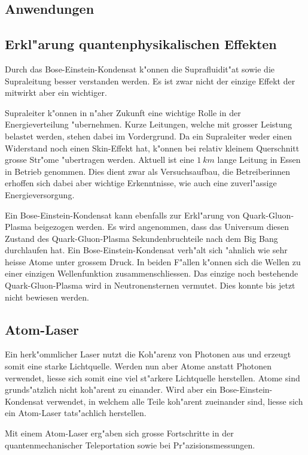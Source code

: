 \begin{refsection}
\section{Anwendungen}
\subsection{Erkl"arung quantenphysikalischen Effekten}
Durch das Bose-Einstein-Kondensat k"onnen die Suprafluidit"at sowie die Supraleitung besser verstanden werden. Es ist zwar nicht der einzige Effekt der mitwirkt aber ein wichtiger. 

Supraleiter k"onnen in n"aher Zukunft eine wichtige Rolle in der Energieverteilung "ubernehmen. Kurze Leitungen, welche mit grosser Leistung belastet werden, stehen dabei im Vordergrund. Da ein Supraleiter weder einen Widerstand noch einen Skin-Effekt hat, k"onnen bei relativ kleinem Querschnitt grosse Str"ome "ubertragen werden. 
Aktuell ist eine $1~km$ lange Leitung in Essen in Betrieb genommen. Dies dient zwar als Versuchsaufbau, die Betreiberinnen erhoffen sich dabei aber wichtige Erkenntnisse, wie auch eine zuverl"assige Energieversorgung. \cite{bose:SupraVerteilnetze}

Ein Bose-Einstein-Kondensat kann ebenfalls zur Erkl"arung von Quark-Gluon-Plasma beigezogen werden. Es wird angenommen, dass das Universum diesen Zustand des Quark-Gluon-Plasma Sekundenbruchteile nach dem Big Bang durchlaufen hat. Ein Bose-Einstein-Kondensat verh"alt sich "ahnlich wie sehr heisse Atome unter grossem Druck. In beiden F"allen k"onnen sich die Wellen zu einer einzigen Wellenfunktion zusammenschliessen. Das einzige noch bestehende Quark-Gluon-Plasma wird in Neutronensternen vermutet. Dies konnte bis jetzt nicht bewiesen werden. \cite{bose:MITvideo}

\subsection{Atom-Laser}
Ein herk"ommlicher Laser nutzt die Koh"arenz von Photonen aus und erzeugt somit eine starke Lichtquelle. Werden nun aber Atome anstatt Photonen verwendet, liesse sich somit eine viel st"arkere Lichtquelle herstellen. Atome sind grunds"atzlich nicht koh"arent zu einander. Wird aber ein Bose-Einstein-Kondensat verwendet, in welchem alle Teile koh"arent zueinander sind, liesse sich ein Atom-Laser tats"achlich herstellen.

Mit einem Atom-Laser erg"aben sich grosse Fortschritte in der quantenmechanischer Teleportation sowie bei Pr"azisionsmessungen.


\end{refsection}
